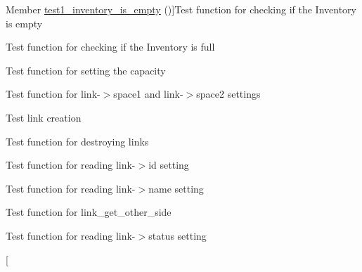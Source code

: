 \begin{DoxyRefList}
Member \hyperlink{inventory__test_8h_afe8c9730e30b58535afc0481970ab2b1}{test1\+\_\+inventory\+\_\+is\+\_\+empty} ()]Test function for checking if the Inventory is empty  
\item[\label{test__test000120}%
\hypertarget{test__test000120}{}%
Member \hyperlink{inventory__test_8h_a7eb3ba387e33c42ff45331c9d9aada34}{test1\+\_\+inventory\+\_\+is\+\_\+full} ()]Test function for checking if the Inventory is full  
\item[\label{test__test000101}%
\hypertarget{test__test000101}{}%
Member \hyperlink{inventory__test_8h_aedc895d6409678b2176d822c105c3796}{test1\+\_\+inventory\+\_\+set\+\_\+max\+\_\+objects} ()]Test function for setting the capacity  
\item[\label{test__test000130}%
\hypertarget{test__test000130}{}%
Member \hyperlink{link__test_8h_af84ec726ff74021eff3ccc9c3116a634}{test1\+\_\+link\+\_\+add\+\_\+space} ()]Test function for link-\/$>$space1 and link-\/$>$space2 settings  
\item[\label{test__test000123}%
\hypertarget{test__test000123}{}%
Member \hyperlink{link__test_8h_a82c5ee441ad22caad8272212a9e9cc26}{test1\+\_\+link\+\_\+create} ()]Test link creation  
\item[\label{test__test000144}%
\hypertarget{test__test000144}{}%
Member \hyperlink{link__test_8h_ad4ca02e93472a080362a005ea4840218}{test1\+\_\+link\+\_\+destroy} ()]Test function for destroying links  
\item[\label{test__test000135}%
\hypertarget{test__test000135}{}%
Member \hyperlink{link__test_8h_a19c70f79fd51d123173f7aaf6ae50bf8}{test1\+\_\+link\+\_\+get\+\_\+id} ()]Test function for reading link-\/$>$id setting  
\item[\label{test__test000137}%
\hypertarget{test__test000137}{}%
Member \hyperlink{link__test_8h_a044128db00a5cc385d7157dea8bdf3c3}{test1\+\_\+link\+\_\+get\+\_\+name} ()]Test function for reading link-\/$>$name setting  
\item[\label{test__test000141}%
\hypertarget{test__test000141}{}%
Member \hyperlink{link__test_8h_a342f65b583bf77b00715e4f76c63c84f}{test1\+\_\+link\+\_\+get\+\_\+other\+\_\+side} ()]Test function for link\+\_\+get\+\_\+other\+\_\+side  
\item[\label{test__test000139}%
\hypertarget{test__test000139}{}%
Member \hyperlink{link__test_8h_a9f7bf73b9398d551c64f6c845e9e1560}{test1\+\_\+link\+\_\+get\+\_\+status} ()]Test function for reading link-\/$>$status setting  
\item[\label{test__test000127}%

\end{DoxyRefList}
